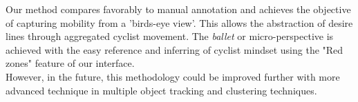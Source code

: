 Our method compares favorably to manual annotation and achieves the objective of capturing mobility
from a 'birds-eye view'. This allows the abstraction of desire lines through aggregated cyclist movement. 
The \textit{ballet} or micro-perspective is achieved with the easy reference and 
inferring of cyclist mindset using the "Red zones" feature of our interface.
\ \\

However, in the future, this methodology could be improved further with more advanced technique in 
multiple object tracking and clustering techniques.
